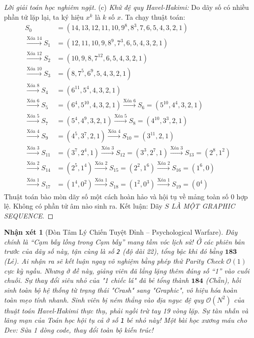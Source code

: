 \documentclass{article}
\newtheorem{nhanxet}{Nhận xét}
\begin{document}
\begin{proof}[Lời giải toán học nghiêm ngặt]
	\item(c) \textit{Khử đệ quy Havel-Hakimi:} 
	Do dãy số có nhiều phần tử lặp lại, ta ký hiệu $x^k$ là $k$ số $x$. Ta chạy thuật toán:
	\begin{align*}
		S_0 &= (14, 13, 12, 11, 10, 9^8, 8^3, 7, 6, 5, 4, 3, 2, 1) \\
		\xrightarrow{\text{Xóa } 14} S_1 &= (12, 11, 10, 9, 8^9, 7^3, 6, 5, 4, 3, 2, 1) \\
		\xrightarrow{\text{Xóa } 12} S_2 &= (10, 9, 8, 7^{12}, 6, 5, 4, 3, 2, 1) \\
		\xrightarrow{\text{Xóa } 10} S_3 &= (8, 7^5, 6^9, 5, 4, 3, 2, 1) \\
		\xrightarrow{\text{Xóa } 8} S_4 &= (6^{11}, 5^4, 4, 3, 2, 1) \\
		\xrightarrow{\text{Xóa } 6} S_5 &= (6^4, 5^{10}, 4, 3, 2, 1) \xrightarrow{\text{Xóa } 6} S_6 = (5^{10}, 4^4, 3, 2, 1) \\
		\xrightarrow{\text{Xóa } 5} S_7 &= (5^4, 4^9, 3, 2, 1) \xrightarrow{\text{Xóa } 5} S_8 = (4^{10}, 3^3, 2, 1) \\
		\xrightarrow{\text{Xóa } 4} S_9 &= (4^5, 3^7, 2, 1) \xrightarrow{\text{Xóa } 4} S_{10} = (3^{11}, 2, 1) \\
		\xrightarrow{\text{Xóa } 3} S_{11} &= (3^7, 2^4, 1) \xrightarrow{\text{Xóa } 3} S_{12} = (3^3, 2^7, 1) \xrightarrow{\text{Xóa } 3} S_{13} = (2^8, 1^2) \\
		\xrightarrow{\text{Xóa } 2} S_{14} &= (2^5, 1^4) \xrightarrow{\text{Xóa } 2} S_{15} = (2^2, 1^6) \xrightarrow{\text{Xóa } 2} S_{16} = (1^6, 0) \\
		\xrightarrow{\text{Xóa } 1} S_{17} &= (1^4, 0^2) \xrightarrow{\text{Xóa } 1} S_{18} = (1^2, 0^3) \xrightarrow{\text{Xóa } 1} S_{19} = (0^4)
	\end{align*}
	Thuật toán bào mòn dãy số một cách hoàn hảo và hội tụ về mảng toàn số $0$ hợp lệ. Không có phần tử âm nào sinh ra. Kết luận: Dãy $S$ \emph{LÀ MỘT GRAPHIC SEQUENCE}.
\end{proof}

\begin{nhanxet}[Đòn Tâm Lý Chiến Tuyệt Đỉnh -- Psychological Warfare]
	Đây chính là \emph{``Cạm bẫy lồng trong Cạm bẫy''} mang tầm vóc lịch sử! Ở các phiên bản trước của dãy số này, tận cùng là số \texttt{2} (độ dài 22), tổng bậc khi đó bằng $\mathbf{183}$ (Lẻ). Ai nhận ra sẽ kết luận ngay vô nghiệm bằng phép thử Parity Check $\mathcal{O}(1)$ cực kỳ ngầu. Nhưng ở đề này, giảng viên đã lẳng lặng \emph{thêm đúng số ``1''} vào cuối chuỗi. Sự thay đổi siêu nhỏ của "1 chiếc lá" đã bẻ tổng thành $\mathbf{184}$ (Chẵn), hồi sinh toàn bộ hệ thống từ trạng thái "Crash" sang "Graphic", vô hiệu hóa hoàn toàn mẹo tính nhanh. Sinh viên bị ném thẳng vào địa ngục đệ quy $\mathcal{O}(N^2)$ của thuật toán Havel-Hakimi thực thụ, phải ngồi trừ tay 19 vòng lặp. Sự tàn nhẫn và lãng mạn của Toán học hội tụ cả ở số \texttt{1} bé nhỏ này! Một bài học xương máu cho Dev: Sửa 1 dòng code, thay đổi toàn bộ kiến trúc!
\end{nhanxet}
\end{document}
